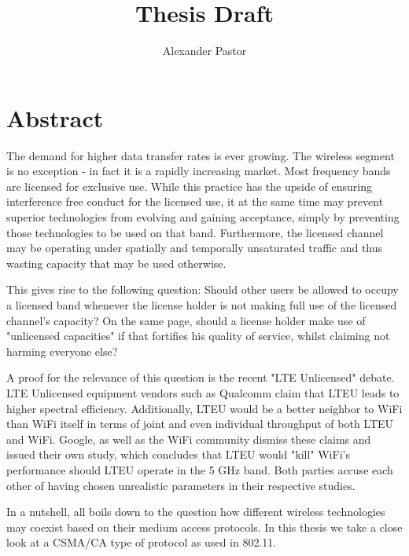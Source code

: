 \documentclass{article}
\begin{document}
	
\title{Thesis Draft}
\author{Alexander Pastor}
\maketitle

\clearpage
\tableofcontents
\clearpage

\section{Abstract}

The demand for higher data transfer rates is ever growing. The wireless segment is no exception - in fact it is a rapidly increasing market. Most frequency bands are licensed for exclusive use. While this practice has the upside of ensuring interference free conduct for the licensed use, it at the same time may prevent superior technologies from evolving and gaining acceptance, simply by preventing those technologies to be used on that band. Furthermore, the licensed channel may be operating under spatially and temporally unsaturated traffic and thus wasting capacity that may be used otherwise. 

\medskip

This gives rise to the following question: Should other users be allowed to occupy a licensed band whenever the license holder is not making full use of the licensed channel's capacity? On the same page, should a license holder make use of "unlicensed capacities" if that fortifies his quality of service, whilst claiming not harming everyone else?

\medskip

A proof for the relevance of this question is the recent "LTE Unlicensed" debate. LTE Unlicensed equipment vendors such as Qualcomm claim that LTEU leads to higher spectral efficiency. Additionally, LTEU would be a better neighbor to WiFi than WiFi itself in terms of joint and even individual throughput of both LTEU and WiFi. Google, as well as the WiFi community dismiss these claims and issued their own study, which concludes that LTEU would "kill" WiFi's performance should LTEU operate in the 5 GHz band. Both parties accuse each other of having chosen unrealistic parameters in their respective studies.

\medskip


In a nutshell, all boils down to the question how different wireless technologies may coexist based on their medium access protocols. In this thesis we take a close look at a CSMA/CA type of protocol as used in 802.11.
\end{document}
